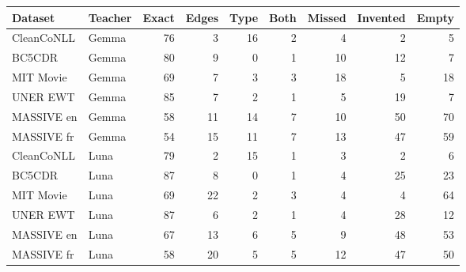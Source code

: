 \begin{tabular}{llrrrrrrr}
\toprule
Dataset & Teacher & Exact & Edges & Type & Both & Missed & Invented & Empty \\
\midrule
CleanCoNLL & Gemma & 76 & 3 & 16 & 2 & 4 & 2 & 5 \\
BC5CDR & Gemma & 80 & 9 & 0 & 1 & 10 & 12 & 7 \\
MIT Movie & Gemma & 69 & 7 & 3 & 3 & 18 & 5 & 18 \\
UNER EWT & Gemma & 85 & 7 & 2 & 1 & 5 & 19 & 7 \\
MASSIVE en & Gemma & 58 & 11 & 14 & 7 & 10 & 50 & 70 \\
MASSIVE fr & Gemma & 54 & 15 & 11 & 7 & 13 & 47 & 59 \\
CleanCoNLL & Luna & 79 & 2 & 15 & 1 & 3 & 2 & 6 \\
BC5CDR & Luna & 87 & 8 & 0 & 1 & 4 & 25 & 23 \\
MIT Movie & Luna & 69 & 22 & 2 & 3 & 4 & 4 & 64 \\
UNER EWT & Luna & 87 & 6 & 2 & 1 & 4 & 28 & 12 \\
MASSIVE en & Luna & 67 & 13 & 6 & 5 & 9 & 48 & 53 \\
MASSIVE fr & Luna & 58 & 20 & 5 & 5 & 12 & 47 & 50 \\
\bottomrule
\end{tabular}
